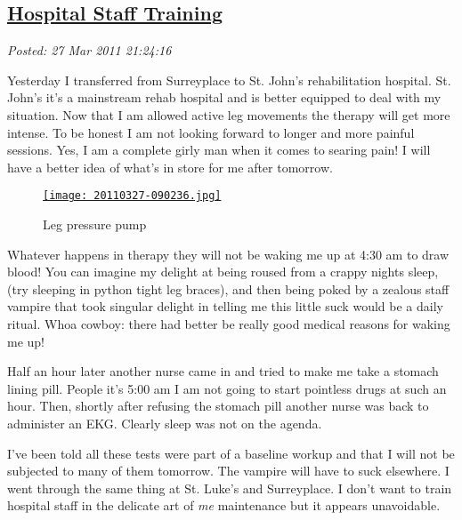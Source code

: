 %

\subsection*{\href{http://bakerjd99.wordpress.com/2011/03/27/hospital-staff-training/}{Hospital Staff Training}}


\noindent\emph{Posted: 27 Mar 2011 21:24:16}
\vspace{6pt}

Yesterday I transferred from Surreyplace to St. John's rehabilitation
hospital. St. John's it's a mainstream rehab hospital and is better
equipped to deal with my situation. Now that I am allowed active leg
movements the therapy will get more intense. To be honest I am not
looking forward to longer and more painful sessions. Yes, I am a
complete girly man when it comes to searing pain! I will have a better
idea of what's in store for me after tomorrow.

\captionsetup[figure]{labelformat=empty}
\begin{figure}
\centering
\href{https://conceptcontrol.smugmug.com/Themes/Diaries/SmugShots/i-Tp8Nq3W/A}{\texttt{[image: 20110327-090236.jpg]}}
\caption{Leg pressure pump}
\label{fig:1241X0}
\end{figure}

Whatever happens in therapy they will not be waking me up at 4:30 am to
draw blood! You can imagine my delight at being roused from a crappy
nights sleep, (try sleeping in python tight leg braces), and then being
poked by a zealous staff vampire that took singular delight in telling
me this little suck would be a daily ritual. Whoa cowboy: there had
better be really good medical reasons for waking me up!

Half an hour later another nurse came in and tried to make me take a
stomach lining pill. People it's 5:00 am I am not going to start
pointless drugs at such an hour. Then, shortly after refusing the
stomach pill another nurse was back to administer an EKG. Clearly sleep
was not on the agenda.

I've been told all these tests were part of a baseline workup and that I
will not be subjected to many of them tomorrow. The vampire will have to
suck elsewhere.
I went through the same thing at St. Luke's and Surreyplace. I don't
want to train hospital staff in the delicate art of \emph{me} maintenance but
it appears unavoidable.





%